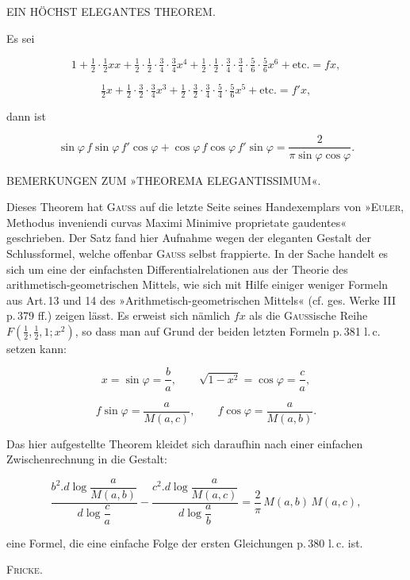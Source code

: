 \clearpage
{}%

\begin{center}
\large EIN HÖCHST ELEGANTES THEOREM.
\end{center}

\bigskip

\noindent\hspace*{\parindent}Es sei

\[ 1+\tfrac{1}{2}\cdot\tfrac{1}{2}xx+\tfrac{1}{2}\cdot\tfrac{1}{2}\cdot\tfrac{3}{4}\cdot\tfrac{3}{4}x^4+\tfrac{1}{2}\cdot\tfrac{1}{2}\cdot\tfrac{3}{4}\cdot\tfrac{3}{4}\cdot\tfrac{5}{6}\cdot\tfrac{5}{6}x^6+\text{etc.} = fx, \]

\[ \tfrac{1}{2}x+\tfrac{1}{2}\cdot\tfrac{3}{2}\cdot\tfrac{3}{4}x^3+\tfrac{1}{2}\cdot\tfrac{3}{2}\cdot\tfrac{3}{4}\cdot\tfrac{5}{4}\cdot\tfrac{5}{6}x^5+\text{etc.} = f'x, \]

\noindent dann ist

\[ \sin\varphi\, f\sin\varphi\, f'\cos\varphi + \cos\varphi\, f\cos\varphi\, f'\sin\varphi = \frac{2}{\pi\sin\varphi\cos\varphi}. \]

\bigskip

\bigskip

\begin{center}
BEMERKUNGEN ZUM »THEOREMA ELEGANTISSIMUM«.
\end{center}

\noindent\hspace*{\parindent}Dieses Theorem hat \textsc{Gauss} auf die letzte Seite seines Handexemplars von »\textsc{Euler}, Methodus inveniendi curvas Maximi Minimive proprietate gaudentes« geschrieben. Der Satz fand hier Aufnahme wegen der eleganten Gestalt der Schlussformel, welche offenbar \textsc{Gauss} selbst frappierte. In der Sache handelt es sich um eine der einfachsten Differentialrelationen aus der Theorie des arithmetisch-geometrischen Mittels, wie sich mit Hilfe einiger weniger Formeln aus Art.\,13 und 14 des »Arithmetisch-geometrischen Mittels« (cf. ges. Werke III p.\,379 ff.) zeigen lässt. Es erweist sich nämlich $fx$ als die \textsc{Gauss}ische Reihe $F(\tfrac{1}{2},\tfrac{1}{2},1;x^2)$, so dass man auf Grund der beiden letzten Formeln p.\,381 l.\,c. setzen kann:

\[ x=\sin\varphi=\frac{b}{a}, \qquad \sqrt{1-x^2}=\cos\varphi=\frac{c}{a}, \]

\[ f\sin\varphi=\frac{a}{M( a,c)}, \qquad f\cos\varphi=\frac{a}{M( a,b)}. \]

\noindent Das hier aufgestellte Theorem kleidet sich daraufhin nach einer einfachen Zwischenrechnung in die Gestalt:

\[ \frac{b^2\mathord{.} d\log\dfrac{a}{M( a,b)}}{d\log\dfrac{c}{a}} - \frac{c^2\mathord{.} d\log\dfrac{a}{M( a,c)}}{d\log\dfrac{a}{b}} = \frac{2}{\pi}\,M( a,b)\,M( a,c), \]

\noindent eine Formel, die eine einfache Folge der ersten Gleichungen p.\,380 l.\,c. ist.

\hfill \textsc{Fricke}.

\bigskip

